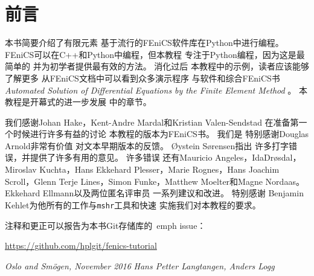 \chapter*{前言}

本书简要介绍了有限元素
基于流行的FEniCS软件库在Python中进行编程。
FEniCS可以在C++和Python中编程，但本教程
专注于Python编程，因为这是最简单的
并为初学者提供最有效的方法。 消化过后
本教程中的示例，读者应该能够了解更多
从FEniCS文档中可以看到众多演示程序
与软件和综合FEniCS书 \emph{Automated
Solution of Differential Equations by the Finite Element Method}
\cite{FEniCS}。 本教程是开幕式的进一步发展
\cite{FEniCS}中的章节。

我们感谢Johan Hake，Kent-Andre Mardal和Kristian Valen-Sendstad
在准备第一个时候进行许多有益的讨论
本教程的版本为FEniCS书\cite{FEniCS}。 我们是
特别感谢Douglas Arnold非常有价值
对文本早期版本的反馈。 Øystein Sørensen指出
许多打字错误，并提供了许多有用的意见。 许多错误
还有Mauricio Angeles，IdaDrøsdal，
Miroslav Kuchta，Hans Ekkehard Plesser，Marie Rognes，Hans Joachim
Scroll，Glenn Terje Lines，Simon Funke，Matthew Moelter和Magne
Nordaas。 Ekkehard Ellmann以及两位匿名评审员
一系列建议和改进。 特别感谢
Benjamin Kehlet为他所有的工作与\texttt{mshr}工具和快速
实施我们对本教程的要求。

注释和更正可以报告为本书Git存储库的\ emph {issue}：
\begin{center}
\url{https://github.com/hplgit/fenics-tutorial}
\end{center}

\vspace{1cm}

\noindent
{\it Oslo and Smögen, November 2016} \hfill  {\it Hans Petter Langtangen, Anders Logg}
